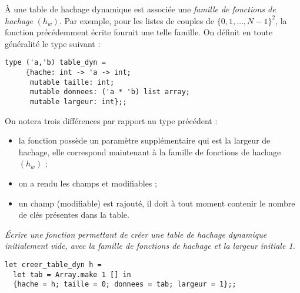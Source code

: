 À une table de hachage dynamique est associée une {\em famille de
fonctions de hachage} $(h_w)$. Par exemple, pour les listes de couples
de $\{0, 1, \ldots, N-1\}^2$, la fonction  précédemment écrite
fournit une telle famille. On définit en toute généralité le type
suivant :
\begin{lstlisting}
type ('a,'b) table_dyn = 
     {hache: int -> 'a -> int;
      mutable taille: int;
      mutable donnees: ('a * 'b) list array;
      mutable largeur: int};;  
\end{lstlisting}
On notera trois
différences par rapport au type précédent :
\begin{itemize}
\item la fonction  possède un paramètre supplémentaire qui
est la largeur de hachage, elle correspond maintenant à la famille de
fonctions de hachage $(h_w)$ ;

\item on a rendu les champs  et  modifiables ;

\item un champ  (modifiable) est rajouté, il doit à tout
moment contenir le nombre de clés présentes dans la table.
\end{itemize}
\begin{Exercise}\it
Écrire une fonction  permettant de créer une
table de hachage dynamique initialement vide, avec la famille de
fonctions de hachage  et la largeur initiale 1.
\end{Exercise}
\begin{Answer}

\begin{lstlisting}
let creer_table_dyn h =
  let tab = Array.make 1 [] in
  {hache = h; taille = 0; donnees = tab; largeur = 1};; 
\end{lstlisting}
\end{Answer}

